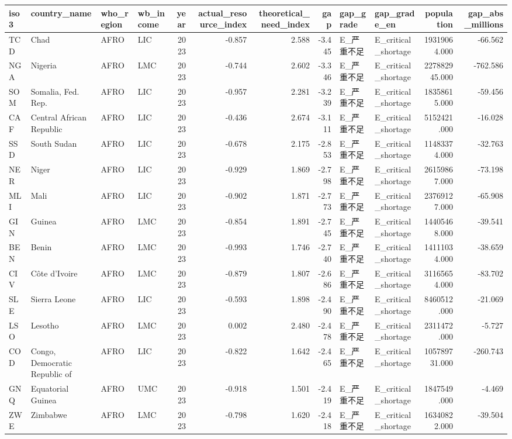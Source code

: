 \begin{tabular}{llllrrrrllrr}
\toprule
iso3 & country_name & who_region & wb_income & year & actual_resource_index & theoretical_need_index & gap & gap_grade & gap_grade_en & population & gap_abs_millions \\
\midrule
TCD & Chad & AFRO & LIC & 2023 & -0.857 & 2.588 & -3.445 & E_严重不足 & E_critical_shortage & 19319064.000 & -66.562 \\
NGA & Nigeria & AFRO & LMC & 2023 & -0.744 & 2.602 & -3.346 & E_严重不足 & E_critical_shortage & 227882945.000 & -762.586 \\
SOM & Somalia, Fed. Rep. & AFRO & LIC & 2023 & -0.957 & 2.281 & -3.239 & E_严重不足 & E_critical_shortage & 18358615.000 & -59.456 \\
CAF & Central African Republic & AFRO & LIC & 2023 & -0.436 & 2.674 & -3.111 & E_严重不足 & E_critical_shortage & 5152421.000 & -16.028 \\
SSD & South Sudan & AFRO & LIC & 2023 & -0.678 & 2.175 & -2.853 & E_严重不足 & E_critical_shortage & 11483374.000 & -32.763 \\
NER & Niger & AFRO & LIC & 2023 & -0.929 & 1.869 & -2.798 & E_严重不足 & E_critical_shortage & 26159867.000 & -73.198 \\
MLI & Mali & AFRO & LIC & 2023 & -0.902 & 1.871 & -2.773 & E_严重不足 & E_critical_shortage & 23769127.000 & -65.908 \\
GIN & Guinea & AFRO & LMC & 2023 & -0.854 & 1.891 & -2.745 & E_严重不足 & E_critical_shortage & 14405468.000 & -39.541 \\
BEN & Benin & AFRO & LMC & 2023 & -0.993 & 1.746 & -2.740 & E_严重不足 & E_critical_shortage & 14111034.000 & -38.659 \\
CIV & Côte d'Ivoire & AFRO & LMC & 2023 & -0.879 & 1.807 & -2.686 & E_严重不足 & E_critical_shortage & 31165654.000 & -83.702 \\
SLE & Sierra Leone & AFRO & LIC & 2023 & -0.593 & 1.898 & -2.490 & E_严重不足 & E_critical_shortage & 8460512.000 & -21.069 \\
LSO & Lesotho & AFRO & LMC & 2023 & 0.002 & 2.480 & -2.478 & E_严重不足 & E_critical_shortage & 2311472.000 & -5.727 \\
COD & Congo, Democratic Republic of & AFRO & LIC & 2023 & -0.822 & 1.642 & -2.465 & E_严重不足 & E_critical_shortage & 105789731.000 & -260.743 \\
GNQ & Equatorial Guinea & AFRO & UMC & 2023 & -0.918 & 1.501 & -2.419 & E_严重不足 & E_critical_shortage & 1847549.000 & -4.469 \\
ZWE & Zimbabwe & AFRO & LMC & 2023 & -0.798 & 1.620 & -2.418 & E_严重不足 & E_critical_shortage & 16340822.000 & -39.504 \\
\bottomrule
\end{tabular}
